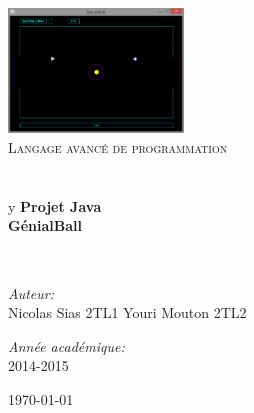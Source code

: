 \begin{titlepage}
\begin{center}

\includegraphics[width=0.35\textwidth]{./TerrainAvecJoueur.png}~\\[1cm]

\textsc{\LARGE Langage avancé de programmation}\\[1.5cm]

\textsc{\Large }\\[0.5cm]

\HRule \\[0.4cm]
y
{\huge \bfseries Projet Java\\
GénialBall \\[0.4cm] }

\HRule \\[1.5cm]

\begin{minipage}{0.4\textwidth}
\begin{flushleft} \large
\emph{Auteur:}\\
Nicolas Sias 2TL1
Youri Mouton 2TL2
\end{flushleft}
\end{minipage}
\begin{minipage}{0.4\textwidth}
\begin{flushright} \large
\emph{Année académique:} \\
2014-2015
\end{flushright}
\end{minipage}

\vfill

{\large \today}

\end{center}
\end{titlepage}
